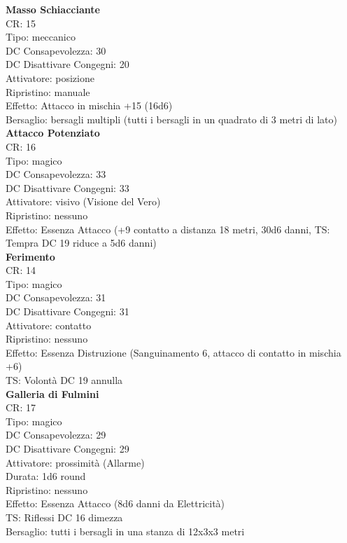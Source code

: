 \documentclass[a4paper,11pt,twoside,openany]{book}
\begin{document}
{\begin{multicols}{2}
\textbf{Masso Schiacciante}\\
CR: 15 \\
Tipo: meccanico \\
DC Consapevolezza: 30 \\
DC Disattivare Congegni: 20 \\
Attivatore: posizione \\
Ripristino: manuale \\
Effetto: Attacco in mischia +15 (16d6) \\
Bersaglio: bersagli multipli (tutti i bersagli in un quadrato di 3 metri di lato)\\

\textbf{Attacco Potenziato}\\
CR: 16 \\
Tipo: magico \\
DC Consapevolezza: 33 \\
DC Disattivare Congegni: 33 \\
Attivatore: visivo (Visione del Vero) \\
Ripristino: nessuno \\
Effetto: Essenza Attacco (+9 contatto a distanza 18 metri, 30d6 danni, TS: Tempra DC 19 riduce a 5d6 danni)\\

\textbf{Ferimento}\\
CR: 14 \\
Tipo: magico \\
DC Consapevolezza: 31 \\
DC Disattivare Congegni: 31 \\
Attivatore: contatto \\
Ripristino: nessuno \\
Effetto: Essenza Distruzione (Sanguinamento 6, attacco di contatto in mischia +6)\\
TS: Volontà DC 19 annulla\\

\textbf{Galleria di Fulmini}\\
CR: 17 \\
Tipo: magico \\
DC Consapevolezza: 29 \\
DC Disattivare Congegni: 29 \\
Attivatore: prossimità (Allarme) \\
Durata: 1d6 round \\
Ripristino: nessuno \\
Effetto: Essenza Attacco (8d6 danni da Elettricità) \\
TS: Riflessi DC 16 dimezza \\
Bersaglio: tutti i bersagli in una stanza di 12x3x3 metri\\


\end{multicols}}
\end{document}
